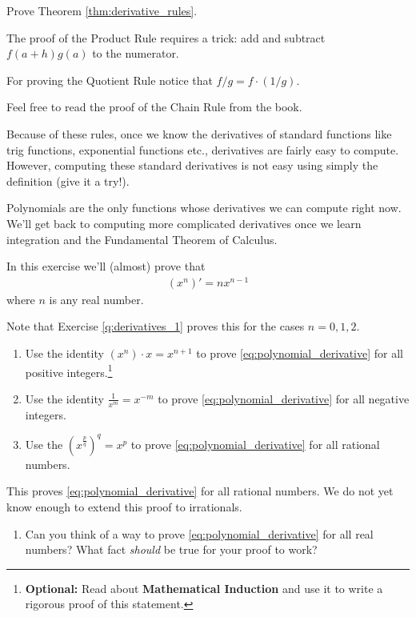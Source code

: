 \begin{exercise}
	Prove Theorem \ref{thm:derivative_rules}.

	The proof of the Product Rule requires a trick: add and subtract $f(a+h) g(a)$ to the numerator.

	For proving the Quotient Rule notice that $f/g = f \cdot (1/g)$.

	Feel free to read the proof of the Chain Rule from the book.
\end{exercise}

Because of these rules, once we know the derivatives of standard functions like trig functions, exponential functions etc., derivatives are fairly easy to compute. However, computing these standard derivatives is not easy using simply the definition (give it a try!).

Polynomials are the only functions whose derivatives we can compute right now. We'll get back to computing more complicated derivatives once we learn integration and the Fundamental Theorem of Calculus.


\begin{exercise} In this exercise we'll (almost) prove that
	\begin{align}
		\label{eq:polynomial_derivative}
		(x^n)' = n x^{n -1}
	\end{align}
	where $n$ is any real number.

	Note that Exercise \ref{q:derivatives_1} proves this for the cases $n = 0, 1, 2$.
	\begin{enumerate}
		\item Use the identity $(x^{n}) \cdot x = x^{n + 1}$ to prove \eqref{eq:polynomial_derivative} for all positive integers.\footnote{{\bf Optional:} Read about {\bf Mathematical Induction} and use it to write a rigorous proof of this statement.}
		\item Use the identity $\frac{1}{x^m} = x^{-m}$ to prove \eqref{eq:polynomial_derivative} for all negative integers.
		\item Use the $\left( x^{\frac{p}{q}}\right)^q = x^p$ to prove \eqref{eq:polynomial_derivative} for all rational numbers.
	\end{enumerate}
	This proves \eqref{eq:polynomial_derivative} for all rational numbers. We do not yet know enough to extend this proof to irrationals.
	\begin{enumerate}[resume]
		\item Can you think of a way to prove \eqref{eq:polynomial_derivative} for all real numbers? What fact {\it should} be true for your proof to work?
	\end{enumerate}
\end{exercise}


